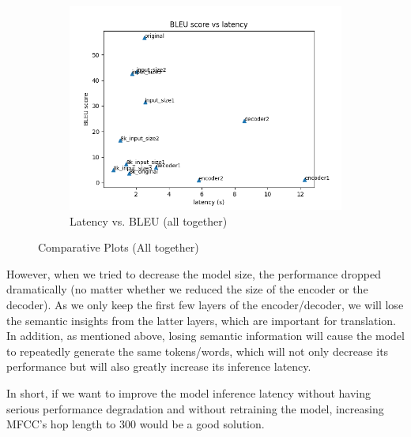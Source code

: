 \documentclass[11pt]{article}
\begin{document}
\begin{figure}[h!]
\begin{subfigure}{0.32\textwidth}
        \includegraphics[width=\textwidth]{images/All/BLEU_vs_latency.png}
        \caption{Latency vs. BLEU (all together)}
    \end{subfigure}
    \caption{\label{fig:all_together}Comparative Plots (All together)}     
\end{figure}
However, when we tried to decrease the model size, the performance dropped dramatically (no matter whether we reduced the size of the encoder or the decoder). As we only keep the first few layers of the encoder/decoder, we will lose the semantic insights from the latter layers, which are important for translation. In addition, as mentioned above, losing semantic information will cause the model to repeatedly generate the same tokens/words, which will not only decrease its performance but will also greatly increase its inference latency.

In short, if we want to improve the model inference latency without having serious performance degradation and without retraining the model, increasing MFCC's hop length to 300 would be a good solution.





\end{document}
